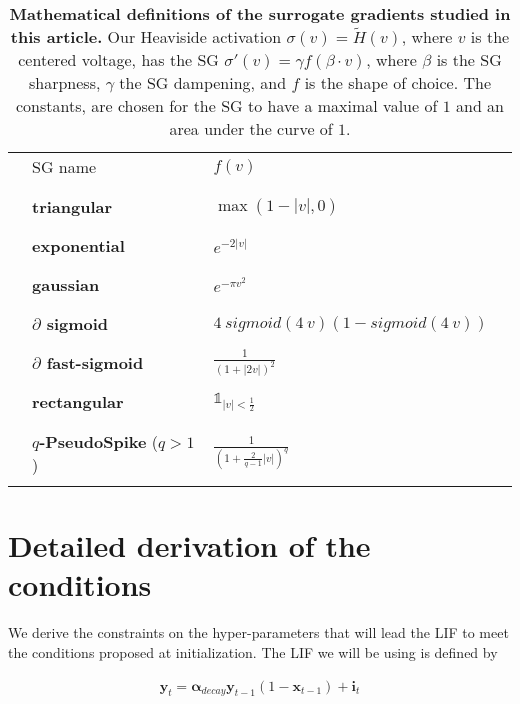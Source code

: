     
\begin{table}[h]
\centering
\small
\begin{tabular}{llll}
 & SG name  & $f(v)$  \\ \\ 
\textcolor{ctr}{\rule{1cm}{2pt}} & \textbf{triangular} & $ \max(1-|v|,0)$  \\ 
\textcolor{cex}{\rule{1cm}{2pt}} & \textbf{exponential} & $e^{-2|v|}$ \\ 
\textcolor{cga}{\rule{1cm}{2pt}} & \textbf{gaussian}  & $ e^{-\pi v^2}$ \\ 
\textcolor{csi}{\rule{1cm}{2pt}} & \textbf{$\partial$ sigmoid} & $4\ sigmoid(4\ v)\left(1-sigmoid(4\ v)\right)$ \\ 
\textcolor{cfa}{\rule{1cm}{2pt}} & \textbf{$\partial$ fast-sigmoid} & $\frac{1}{(1+|2v|)^2}$ \\ 
\textcolor{cre}{\rule{1cm}{2pt}} & \textbf{rectangular} &  $\mathbb{1}_{|v|<\frac{1}{2}}$ \\ \\ 
\textcolor{cnt}{\rule{1cm}{2pt}} &
\shortstack{\textbf{$q$-PseudoSpike} \\ ($q>1$)} & $\frac{1}{(1+\frac{2}{q-1}|v|)^q}$ \\ \\
\end{tabular}
\caption{\textbf{Mathematical definitions of the surrogate gradients studied in this article.}
Our Heaviside activation $\sigma(v)=\tilde{H}(v)$, where $v$ is the centered voltage, has the SG $\sigma'(v) = \gamma f(\beta\cdot v)$, where $\beta$ is the SG sharpness, $\gamma$ the SG dampening, and $f$ is the shape of choice. The constants, are chosen for the SG to have a maximal value of $1$ and an area under the curve of $1$.}
\end{table}





\section{Detailed derivation of the conditions}

\label{sec:conditionsdetails}

We derive the constraints on the hyper-parameters that will lead the LIF to meet the conditions proposed at initialization. The LIF we will be using
is defined by

\begin{align}
    \boldsymbol{y}_t = \boldsymbol{\alpha}_{decay} \boldsymbol{y}_{t-1}(1-\boldsymbol{x}_{t-1}) + \boldsymbol{i}_{t}
\end{align}


